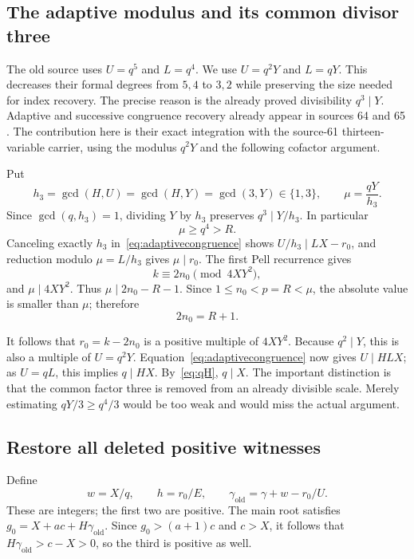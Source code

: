 \documentclass[11pt]{article}
\theoremstyle{remark}
\begin{document}
\subsection{The adaptive modulus and its common divisor three}

The old source uses $U=q^5$ and $L=q^4$. We use $U=q^2Y$ and $L=qY$.
This decreases their formal degrees from $5,4$ to $3,2$ while preserving
the size needed for index recovery. The precise reason is the already
proved divisibility $q^3\mid Y$.
Adaptive and successive congruence recovery already appear in sources 64
and 65 \cite{source64,source65}. The contribution here is their exact
integration with the source-61 thirteen-variable carrier, using the modulus
$q^2Y$ and the following cofactor argument.

Put
\[
 h_3=\gcd(H,U)=\gcd(H,Y)=\gcd(3,Y)\in\{1,3\},
 \qquad \mu=\frac{qY}{h_3}.
\]
Since $\gcd(q,h_3)=1$, dividing $Y$ by $h_3$ preserves $q^3\mid Y/h_3$.
In particular
\begin{equation}
 \mu\ge q^4>R.\label{eq:mu}
\end{equation}
Canceling exactly $h_3$ in~\eqref{eq:adaptivecongruence} shows
$U/h_3\mid LX-r_0$, and reduction modulo $\mu=L/h_3$ gives
$\mu\mid r_0$. The first Pell recurrence gives
\[
 k\equiv2n_0\pmod{4XY^2},
\]
and $\mu\mid4XY^2$. Thus $\mu\mid2n_0-R-1$.
Since $1\le n_0<p=R<\mu$, the absolute value is smaller than $\mu$;
therefore
\begin{equation}
 2n_0=R+1.\label{eq:exactfirstindex}
\end{equation}

It follows that $r_0=k-2n_0$ is a positive multiple of $4XY^2$.
Because $q^2\mid Y$, this is also a multiple of $U=q^2Y$.
Equation~\eqref{eq:adaptivecongruence} now gives $U\mid HLX$;
as $U=qL$, this implies $q\mid HX$. By~\eqref{eq:qH}, $q\mid X$.
The important distinction is that the common factor three is removed from
an already divisible scale. Merely estimating $qY/3\ge q^4/3$ would be
too weak and would miss the actual argument.

\subsection{Restore all deleted positive witnesses}

Define
\[
 w=X/q,\qquad h=r_0/E,\qquad
 \gamma_{\mathrm{old}}=\gamma+w-r_0/U.
\]
These are integers; the first two are positive. The main root satisfies
$g_0=X+ac+H\gamma_{\mathrm{old}}$. Since
$g_0>(a+1)c$ and $c>X$, it follows that
$H\gamma_{\mathrm{old}}>c-X>0$, so the third is positive as well.
\end{document}
